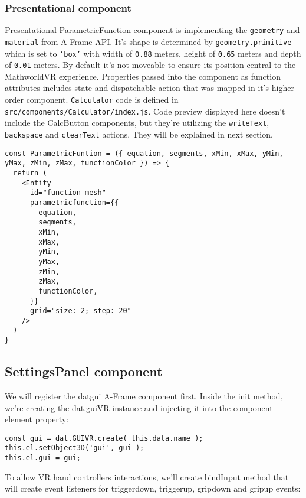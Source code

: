 \subsubsection{Presentational component}
Presentational ParametricFunction component is implementing the \texttt{geometry} and \texttt{material} from A-Frame API. It's shape is determined by \texttt{geometry.primitive} which is set to \texttt{'box'} with width of \texttt{0.88} meters, height of \texttt{0.65} meters and depth of \texttt{0.01} meters. By default it's not moveable to ensure its position central to the MathworldVR experience. Properties passed into the component as function attributes includes state and dispatchable action that was mapped in it's higher-order component. \texttt{Calculator} code is defined in \texttt{src/components/Calculator/index.js}. Code preview displayed here doesn't include the CalcButton components, but they're utilizing the \texttt{writeText}, \texttt{backspace} and \texttt{clearText} actions. They will be explained in next section.

\begin{lstlisting}[caption={Presentational \texttt{ParametricFunction} component code.},captionpos=b]
const ParametricFuntion = ({ equation, segments, xMin, xMax, yMin, yMax, zMin, zMax, functionColor }) => {
  return (
    <Entity
      id="function-mesh"
      parametricfunction={{
        equation,
        segments,
        xMin,
        xMax,
        yMin,
        yMax,
        zMin,
        zMax,
        functionColor,
      }}
      grid="size: 2; step: 20"
    />
  )
}
\end{lstlisting}

\subsection{SettingsPanel component}

We will register the datgui A-Frame component first. Inside the init method, we're creating the dat.guiVR instance and injecting it into the component element property:

\begin{lstlisting}
const gui = dat.GUIVR.create( this.data.name );
this.el.setObject3D('gui', gui );
this.el.gui = gui;
\end{lstlisting}

To allow VR hand controllers interactions, we'll create bindInput method that will create event listeners for triggerdown, triggerup, gripdown and gripup events:

